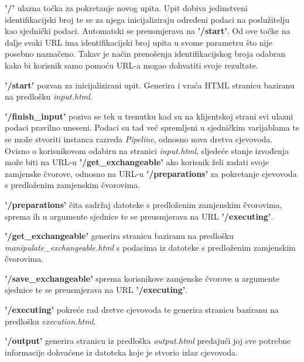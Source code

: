 \begin{itemize}

    \item \textbf{'/'} ulazna točka za pokretanje novog upita. Upit dobiva
jedinstveni identifikacijski broj te se za njega inicijaliziraju određeni podaci
na poslužitelju kao sjednički podaci. Automatski se preusmjerava na
\textbf{'/start'}. Od ove točke na dalje svaki URL ima identifikacijski broj upita
u svome parametru što nije posebno naznačeno. Takav je način prenošenja
identifikacijskog broja odabran kako bi korisnik samo pomoću URL-a mogao
dohvatiti svoje rezultate.

    \item \textbf{'/start'} pozvan za inicijalizirani upit. Generira i vraća
HTML stranicu baziranu na predlošku \emph{input.html}.

    \item \textbf{'/finish\_input'} poziva se tek u trenutku kad su na klijentskoj
strani svi ulazni podaci pravilno uneseni. Podaci su tad već spremljeni u
sjedničkim varijablama te se može stvoriti instanca razreda \emph{Pipeline},
odnosno nova dretva cjevovoda. Ovisno o korisnikovom odabiru na stranici
\emph{input.html}, sljedeće stanje izvođenja može biti na URL-u
\textbf{'/get\_exchangeable'} ako korisnik želi zadati svoje zamjenske čvorove,
odnosno na URL-u \textbf{'/preparations'} za pokretanje cjevovoda s predloženim
zamjenskim čvorovima.

    \item \textbf{'/preparations'} čita sadržaj datoteke s predloženim
zamjenskim čvorovima, sprema ih u argumente sjednice te se preusmjerava na URL
\textbf{'/executing'}.

\begin{sloppypar}

    \item \textbf{'/get\_exchangeable'} generira stranicu baziranu na predlošku
\emph{manipulate\_exchangeable.html} s podacima  iz datoteke s predloženim
zamjenskim čvorovima.

\end{sloppypar}

    \item \textbf{'/save\_exchangeable'} sprema korisnikove zamjenske čvorove u
argumente sjednice te se preusmjerava na URL \textbf{'/executing'}.

    \item \textbf{'/executing'} pokreće rad dretve cjevovoda te generira
stranicu baziranu na predlošku \emph{execution.html}.

    \item \textbf{'/output'} generira stranicu iz predloška \emph{output.html}
predajući joj sve potrebne informacije dohvaćene iz datoteka koje je stvorio
izlaz cjevovoda.

\end{itemize}

